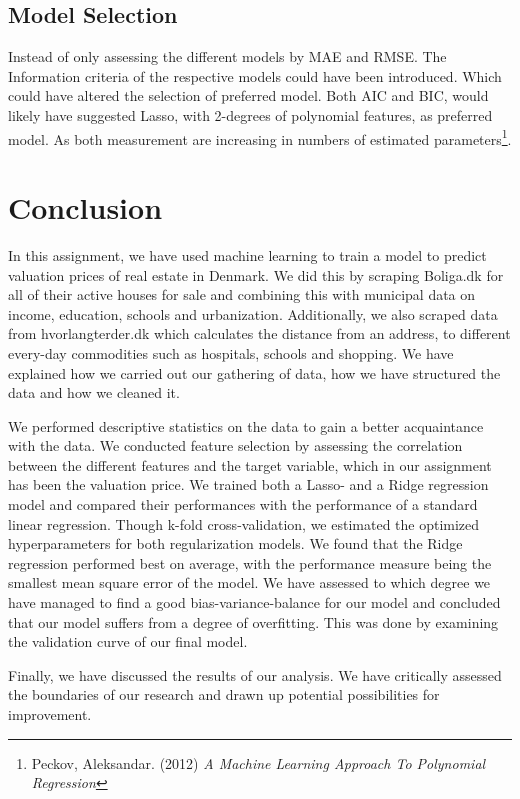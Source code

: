 \documentclass[12pt,a4paper]{article}
\begin{document}
\subsection{Model Selection}
Instead of only assessing the different models by MAE and RMSE.
The Information criteria of the respective models could have been introduced. Which could have altered the selection of preferred model. Both AIC and BIC, would likely have suggested Lasso, with 2-degrees of polynomial features, as preferred model. As both measurement are increasing in numbers of estimated parameters\footnote{Peckov, Aleksandar. (2012)  \textit{A Machine Learning Approach To Polynomial Regression}}. 

\section{Conclusion}
In this assignment, we have used machine learning to train a model to predict valuation prices of real estate in Denmark. We did this by scraping Boliga.dk for all of their active houses for sale and combining this with municipal data on income, education, schools and urbanization. Additionally, we also scraped data from hvorlangterder.dk which calculates the distance from an address, to different every-day commodities such as hospitals, schools and shopping. 
We have explained how we carried out our gathering of data, how we have structured the data and how we cleaned it. 

We performed descriptive statistics on the data to gain a better acquaintance with the data. 
We conducted feature selection by assessing the correlation between the different features and the target variable, which in our assignment has been the valuation price. 
We trained both a Lasso- and a Ridge regression model and compared their performances with the performance of a standard linear regression. Though k-fold cross-validation, we estimated the optimized hyperparameters for both regularization models. We found that the Ridge regression performed best on average, with the performance measure being the smallest mean square error of the model. 
We have assessed to which degree we have managed to find a good bias-variance-balance for our model and concluded that our model suffers from a degree of overfitting. This was done by examining the validation curve of our final model.

Finally, we have discussed the results of our analysis. We have critically assessed the boundaries of our research and drawn up potential possibilities for improvement. 
\end{document}
